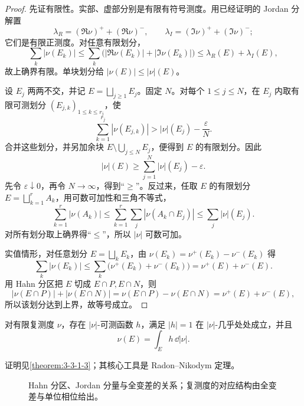 \begin{proof}
先证有限性。实部、虚部分别是有限有符号测度。用已经证明的 Jordan 分解置
\[
 \lambda_R=(\Re\nu)^++(\Re\nu)^-,\qquad
 \lambda_I=(\Im\nu)^++(\Im\nu)^-;
\]
它们是有限正测度。对任意有限划分，
\[
 \sum_k|\nu(E_k)|
 \le\sum_k\bigl(|\Re\nu(E_k)|+|\Im\nu(E_k)|\bigr)
 \le \lambda_R(E)+\lambda_I(E),
\]
故上确界有限。单块划分给 $|\nu(E)|\le|\nu|(E)$。

设 $E_j$ 两两不交，并记 $E=\bigsqcup_{j\ge1}E_j$。固定 $N$。对每个 $1\le j\le N$，在
$E_j$ 内取有限可测划分 $(E_{j,k})_{1\le k\le r_j}$，使
\[
 \sum_{k=1}^{r_j}|\nu(E_{j,k})|>|\nu|(E_j)-\frac{\varepsilon}{N}.
\]
合并这些划分，并另加余块
$E\setminus\bigcup_{j\le N}E_j$，便得到 $E$ 的有限划分。因此
\[
 |\nu|(E)\ge\sum_{j=1}^N|\nu|(E_j)-\varepsilon.
\]
先令 $\varepsilon\downarrow0$，再令 $N\to\infty$，得到“$\ge$”。反过来，任取 $E$ 的有限划分
$E=\bigsqcup_{k=1}^rA_k$，用可数可加性和三角不等式，
\[
 \sum_{k=1}^r|\nu(A_k)|
 \le\sum_{k=1}^r\sum_j|\nu(A_k\cap E_j)|
 \le\sum_j|\nu|(E_j).
\]
对所有划分取上确界得“$\le$”，所以 $|\nu|$ 可数可加。

实值情形，对任意划分 $E=\bigsqcup_kE_k$，由
$\nu(E_k)=\nu^+(E_k)-\nu^-(E_k)$ 得
\[
 \sum_k|\nu(E_k)|
 \le\sum_k\bigl(\nu^+(E_k)+\nu^-(E_k)\bigr)
 =\nu^+(E)+\nu^-(E).
\]
用 Hahn 分区把 $E$ 切成 $E\cap P,E\cap N$，则
\[
 |\nu(E\cap P)|+|\nu(E\cap N)|
 =\nu(E\cap P)-\nu(E\cap N)
 =\nu^+(E)+\nu^-(E),
\]
所以该划分达到上界，故等号成立。
\end{proof}

\begin{theorem}[复测度极分解]\label{theorem:2-2-3-4}
对有限复测度 $\nu$，存在 $|\nu|$-可测函数 $h$，满足
$|h|=1$ 在 $|\nu|$-几乎处处成立，并且
\[
 \nu(E)=\int_Eh\,\dd|\nu|.
\]
\end{theorem}

证明见\cref{theorem:3-3-1-3}；其核心工具是 Radon--Nikodym 定理。

\begin{figure}[htbp]
\centering
{}
\caption{Hahn 分区、Jordan 分量与全变差的关系；复测度的对应结构由全变差与单位相位给出。}
\label{fig:hahn-jordan-variation}
\end{figure}

